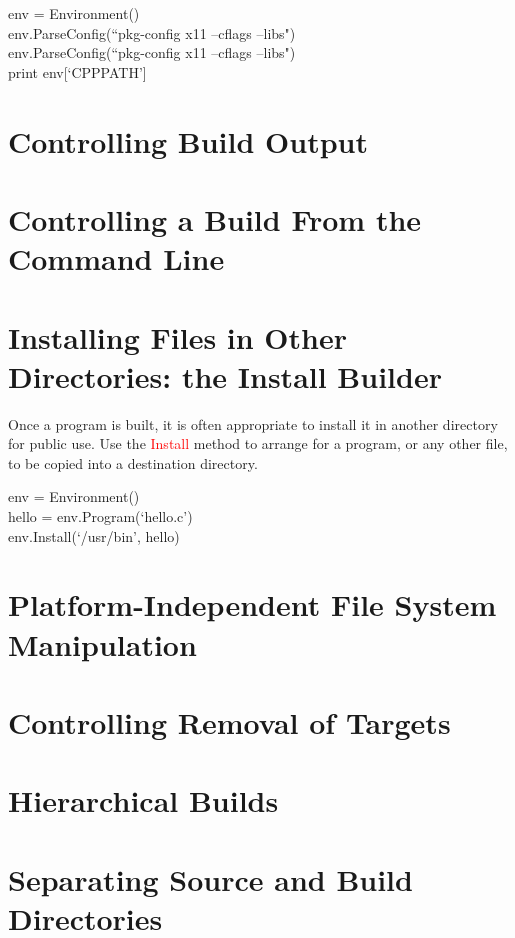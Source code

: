 \documentclass[12pt,a4paper]{article}
\begin{document}
env = Environment() \\
env.ParseConfig(``pkg-config x11 --cflags --libs") \\
env.ParseConfig(``pkg-config x11 --cflags --libs") \\
print env[`CPPPATH']



\section{Controlling Build Output}



\section{Controlling a Build From the Command Line}



\section{Installing Files in Other Directories: the Install Builder}
Once a program is built, it is often appropriate to install it in another directory for public use. Use the \textcolor{red}{Install} method to arrange for a program, or any other file, to be copied into a destination directory.
 
env = Environment() \\
hello = env.Program(`hello.c') \\
env.Install(`/usr/bin', hello)

\section{Platform-Independent File System Manipulation}


\section{Controlling Removal of Targets}


\section{Hierarchical Builds}


\section{Separating Source and Build Directories}
\end{document}
